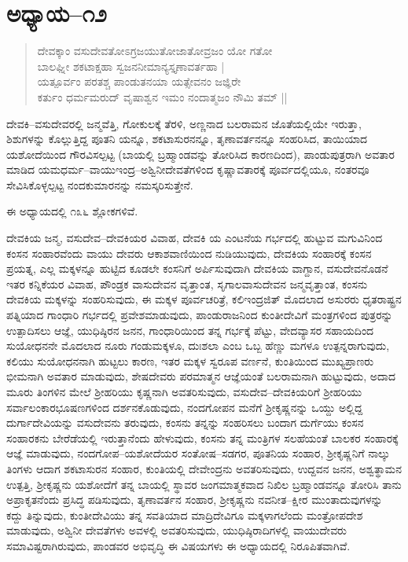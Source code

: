 \section{ಅಧ್ಯಾಯ–೧೨}

\begin{verse}
ದೇವಕ್ಕಾಂ ವಸುದೇವತೋಽಗ್ರಜಯುತೋಜಾತೋವ್ರಜಂ ಯೋ ಗತೋ\\ ಬಾಲಘ್ನೀ ಶಕಟಾಕ್ಷಹಾ ಸ್ವಜನನೀಮಾನ್ಯಸ್ತೃಣಾವರ್ತಹಾ |\\ ಯತ್ಪೂರ್ವಂ ಪರತಶ್ಚ ಪಾಂಡುತನಯಾ ಯತ್ಸೇವನಂ ಜಜ್ಞಿರೇ\\ ಕರ್ತುಂ ಧರ್ಮಮರುದ್ ವೃಷಾಶ್ವನ ಇಮಂ ನಂದಾತ್ಮಜಂ ನೌಮಿ ತಮ್ ||
\end{verse}

ದೇವಕಿ–ವಸುದೇವರಲ್ಲಿ ಜನ್ಮವೆತ್ತಿ, ಗೋಕುಲಕ್ಕೆ ತೆರಳಿ, ಅಣ್ಣನಾದ ಬಲರಾಮನ ಜೊತೆಯಲ್ಲಿಯೇ ಇರುತ್ತಾ, ಶಿಶುಗಳನ್ನು ಕೊಲ್ಲುತ್ತಿದ್ದ ಪೂತನಿ ಯನ್ನೂ, ಶಕಟಾಸುರನನ್ನೂ, ತೃಣಾವರ್ತನನ್ನೂ ಸಂಹರಿಸಿದ, ತಾಯಿಯಾದ ಯಶೋದೆಯಿಂದ ಗೌರವಿಸಲ್ಪಟ್ಟ (ಬಾಯಲ್ಲಿ ಬ್ರಹ್ಮಾಂಡವನ್ನು ತೋರಿಸಿದ ಕಾರಣದಿಂದ), ಪಾಂಡುಪುತ್ರರಾಗಿ ಅವತಾರ ಮಾಡಿದ ಯಮಧರ್ಮ–ವಾಯುಇಂದ್ರ–ಅಶ್ವಿನೀದೇವತೆಗಳಿಂದ ಕೃಷ್ಣಾವತಾರಕ್ಕೆ ಪೂರ್ವದಲ್ಲಿಯೂ, ನಂತರವೂ ಸೇವಿಸಿಕೊಳ್ಳಲ್ಪಟ್ಟ ನಂದಕುಮಾರನನ್ನು ನಮಸ್ಕರಿಸುತ್ತೇನೆ.

ಈ ಅಧ್ಯಾಯದಲ್ಲಿ ೧೩೬ ಶ್ಲೋಕಗಳಿವೆ.

ದೇವಕಿಯ ಜನ್ಮ, ವಸುದೇವ–ದೇವಕಿಯರ ವಿವಾಹ, ದೇವಕಿ ಯ ಎಂಟನೆಯ ಗರ್ಭದಲ್ಲಿ ಹುಟ್ಟುವ ಮಗುವಿನಿಂದ ಕಂಸನ ಸಂಹಾರವೆಂದು ವಾಯು ದೇವರು ಆಕಾಶವಾಣಿಯಿಂದ ನುಡಿಯುವುದು, ದೇವಕಿಯ ಸಂಹಾರಕ್ಕೆ ಕಂಸನ ಪ್ರಯತ್ನ, ಎಲ್ಲ ಮಕ್ಕಳನ್ನೂ ಹುಟ್ಟಿದ ಕೂಡಲೇ ಕಂಸನಿಗೆ ಅರ್ಪಿಸುವುದಾಗಿ ದೇವಕಿಯ ವಾಗ್ದಾನ, ವಸುದೇವನೊಡನೆ ಇತರ ಕನ್ನಿಕೆಯರ ವಿವಾಹ, ಪೌಂಡ್ರಕ ವಾಸುದೇವನ ವೃತ್ತಾಂತ, ಸೃಗಾಲವಾಸುದೇವನ ಜನ್ಮವೃತ್ತಾಂತ, ಕಂಸನು ದೇವಕಿಯ ಮಕ್ಕಳನ್ನು ಸಂಹರಿಸುವುದು, ಈ ಮಕ್ಕಳ ಪೂರ್ವಚರಿತ್ರೆ, ಕಲಿಇಂದ್ರಜಿತ್ ಮೊದಲಾದ ಅಸುರರು ಧೃತರಾಷ್ಟ್ರನ ಪತ್ನಿಯಾದ ಗಾಂಧಾರಿ ಗರ್ಭದಲ್ಲಿ ಪ್ರವೇಶಮಾಡುವುದು, ಪಾಂಡುರಾಜನಿಂದ ಕುಂತೀದೇವಿಗೆ ಮಂತ್ರಗಳಿಂದ ಪುತ್ರರನ್ನು ಉತ್ಪಾದಿಸಲು ಆಜ್ಞೆ, ಯುಧಿಷ್ಠಿರನ ಜನನ, ಗಾಂಧಾರಿಯಿಂದ ತನ್ನ ಗರ್ಭಕ್ಕೆ ಪೆಟ್ಟು, ವೇದವ್ಯಾಸರ ಸಹಾಯದಿಂದ ಸುಯೋಧನನೇ ಮೊದಲಾದ ನೂರು ಗಂಡುಮಕ್ಕಳೂ, ದುಃಶಲಾ ಎಂಬ ಒಬ್ಬ ಹೆಣ್ಣು ಮಗಳೂ ಉತ್ಪನ್ನರಾಗುವುದು, ಕಲಿಯು ಸುಯೋಧನನಾಗಿ ಹುಟ್ಟಲು ಕಾರಣ, ಇತರ ಮಕ್ಕಳ ಸ್ವರೂಪ ವರ್ಣನೆ, ಕುಂತಿಯಿಂದ ಮುಖ್ಯಪ್ರಾಣರು ಭೀಮನಾಗಿ ಅವತಾರ ಮಾಡುವುದು, ಶೇಷದೇವರು ಪರಮಾತ್ಮನ ಆಜ್ಞೆಯಂತೆ ಬಲರಾಮನಾಗಿ ಹುಟ್ಟುವುದು, ಅದಾದ ಮೂರು ತಿಂಗಳಿನ ಮೇಲೆ ಶ‍್ರೀಹರಿಯು ಕೃಷ್ಣನಾಗಿ ಅವತರಿಸುವುದು, ವಸುದೇವ–ದೇವಕಿಯರಿಗೆ ಶ‍್ರೀಹರಿಯು ಸರ್ವಾಲಂಕಾರಭೂಷಣಗಳಿಂದ ದರ್ಶನಕೊಡುವುದು, ನಂದಗೋಪನ ಮನೆಗೆ ಶ‍್ರೀಕೃಷ್ಣನನ್ನು ಒಯ್ದು ಅಲ್ಲಿದ್ದ ದುರ್ಗಾದೇವಿಯನ್ನು ವಸುದೇವನು ತರುವುದು, ಕಂಸನು ತನ್ನನ್ನು ಸಂಹರಿಸಲು ಬಂದಾಗ ದುರ್ಗೆಯು ಕಂಸನ ಸಂಹಾರಕನು ಬೇರೆಡೆಯಲ್ಲಿ ಇರುತ್ತಾನೆಂದು ಹೇಳುವುದು, ಕಂಸನು ತನ್ನ ಮಂತ್ರಿಗಳ ಸಲಹೆಯಂತೆ ಬಾಲಕರ ಸಂಹಾರಕ್ಕೆ ಆಜ್ಞೆ ಮಾಡುವುದು, ನಂದಗೋಪ–ಯಶೋದೆಯರ ಸಂತೋಷ–ಸಡಗರ, ಪೂತನಿಯ ಸಂಹಾರ, ಶ‍್ರೀಕೃಷ್ಣನಿಗೆ ನಾಲ್ಕು ತಿಂಗಳು ಆದಾಗ ಶಕಟಾಸುರನ ಸಂಹಾರ, ಕುಂತಿಯಲ್ಲಿ ದೇವೇಂದ್ರನು ಅವತರಿಸುವುದು, ಉದ್ದವನ ಜನನ, ಅಶ್ವತ್ಥಾಮನ ಉತ್ಪತ್ತಿ, ಶ‍್ರೀಕೃಷ್ಣನು ಯಶೋದೆಗೆ ತನ್ನ ಬಾಯಲ್ಲಿ ಸ್ಥಾವರ ಜಂಗಮಾತ್ಮಕವಾದ ನಿಖಿಲ ಬ್ರಹ್ಮಾಂಡವನ್ನೂ ತೋರಿಸಿ ತಾನು ಅಪ್ರಾಕೃತನೆಂದು ಪ್ರಸಿದ್ಧ ಪಡಿಸುವುದು, ತೃಣಾವರ್ತನ ಸಂಹಾರ, ಶ‍್ರೀಕೃಷ್ಣನು ನವನೀತ–ಕ್ಷೀರ ಮುಂತಾದುವುಗಳನ್ನು ಕದ್ದು ತಿನ್ನುವುದು, ಕುಂತೀದೇವಿಯು ತನ್ನ ಸವತಿಯಾದ ಮಾದ್ರಿದೇವಿಗೂ ಮಕ್ಕಳಾಗಲೆಂದು ಮಂತ್ರೋಪದೇಶ ಮಾಡುವುದು, ಅಶ್ವಿನೀ ದೇವತೆಗಳು ಅವಳಲ್ಲಿ ಅವತರಿಸುವುದು, ಯುಧಿಷ್ಠಿರಾದಿಗಳಲ್ಲಿ ವಾಯುದೇವರು ಸಮಾವಿಷ್ಟರಾಗಿರುವುದು, ಪಾಂಡವರ ಅಭಿವೃದ್ಧಿ ಈ ವಿಷಯಗಳು ಈ ಅಧ್ಯಾಯದಲ್ಲಿ ನಿರೂಪಿತವಾಗಿವೆ.



